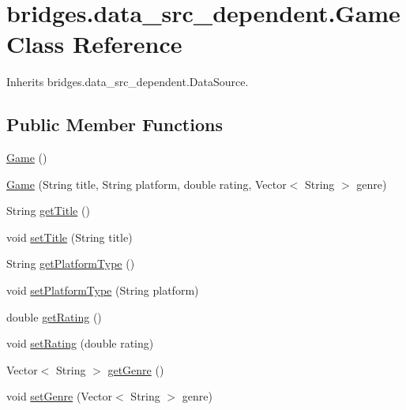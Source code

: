 \hypertarget{classbridges_1_1data__src__dependent_1_1_game}{}\section{bridges.\+data\+\_\+src\+\_\+dependent.\+Game Class Reference}
\label{classbridges_1_1data__src__dependent_1_1_game}


Inherits bridges.\+data\+\_\+src\+\_\+dependent.\+Data\+Source.

\subsection*{Public Member Functions}
\begin{DoxyCompactItemize}
\item 
\mbox{\hyperlink{classbridges_1_1data__src__dependent_1_1_game_a9f145dbcbbfbb0432a2cd8631e57173b}{Game}} ()
\item 
\mbox{\hyperlink{classbridges_1_1data__src__dependent_1_1_game_a2bb9d9f659184be2cc9fc68e38433492}{Game}} (String title, String platform, double rating, Vector$<$ String $>$ genre)
\item 
String \mbox{\hyperlink{classbridges_1_1data__src__dependent_1_1_game_af92a6fdd0e852e6cc5d97fb193be4ca9}{get\+Title}} ()
\item 
void \mbox{\hyperlink{classbridges_1_1data__src__dependent_1_1_game_a0c87151b75bc10357aa6829ebfc0cae3}{set\+Title}} (String title)
\item 
String \mbox{\hyperlink{classbridges_1_1data__src__dependent_1_1_game_a1eef8e419c6302ba83ea595491412494}{get\+Platform\+Type}} ()
\item 
void \mbox{\hyperlink{classbridges_1_1data__src__dependent_1_1_game_ab4d51e07186a9228c50210cf661304c7}{set\+Platform\+Type}} (String platform)
\item 
double \mbox{\hyperlink{classbridges_1_1data__src__dependent_1_1_game_a83b444e2c487701b4e9789a6a35ae210}{get\+Rating}} ()
\item 
void \mbox{\hyperlink{classbridges_1_1data__src__dependent_1_1_game_ab59c6ea5ee2721dcca2246e8e287154f}{set\+Rating}} (double rating)
\item 
Vector$<$ String $>$ \mbox{\hyperlink{classbridges_1_1data__src__dependent_1_1_game_ab3c0e46513e71b56a2970ac014b1bf79}{get\+Genre}} ()
\item 
void \mbox{\hyperlink{classbridges_1_1data__src__dependent_1_1_game_ab3c9d9cd9f0acdd7bdc6ea7e1b140868}{set\+Genre}} (Vector$<$ String $>$ genre)
\end{DoxyCompactItemize}


